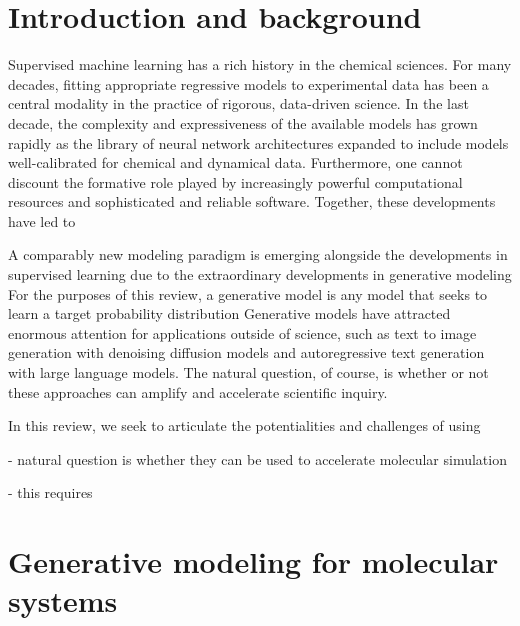 \documentclass[final,3p,times,twocolumn]{elsarticle}
\begin{document}
\begin{frontmatter}
\begin{keyword}



\end{keyword}

\end{frontmatter}


\section{Introduction and background}
\label{sec:intro}


Supervised machine learning has a rich history in the chemical sciences. 
For many decades, fitting appropriate regressive models to experimental data has been a central modality in the practice of rigorous, data-driven science.
In the last decade, the complexity and expressiveness of the available models has grown rapidly as the library of neural network architectures expanded to include models well-calibrated for chemical and dynamical data. 
Furthermore, one cannot discount the formative role played by increasingly powerful computational resources and sophisticated and reliable software. 
Together, these developments have led to 

A comparably new modeling paradigm is emerging alongside the developments in supervised learning due to the extraordinary developments in generative modeling
For the purposes of this review, a generative model is any model that seeks to learn a target probability distribution
Generative models have attracted enormous attention for applications outside of science, such as text to image generation with denoising diffusion models and autoregressive text generation with large language models. 
The natural question, of course, is whether or not these approaches can amplify and accelerate scientific inquiry.

In this review, we seek to articulate the potentialities and challenges of using 

- natural question is whether they can be used to accelerate molecular simulation

- this requires 

\section{Generative modeling for molecular systems}
\end{document}

